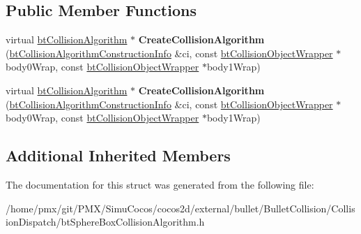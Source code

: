 \subsection*{Public Member Functions}
\begin{DoxyCompactItemize}
\item 
\mbox{\label{structbtSphereBoxCollisionAlgorithm_1_1CreateFunc_a9b840f1c69eb28d91b0cf8dbc6453d09}} 
virtual \hyperlink{classbtCollisionAlgorithm}{bt\+Collision\+Algorithm} $\ast$ {\bfseries Create\+Collision\+Algorithm} (\hyperlink{structbtCollisionAlgorithmConstructionInfo}{bt\+Collision\+Algorithm\+Construction\+Info} \&ci, const \hyperlink{structbtCollisionObjectWrapper}{bt\+Collision\+Object\+Wrapper} $\ast$body0\+Wrap, const \hyperlink{structbtCollisionObjectWrapper}{bt\+Collision\+Object\+Wrapper} $\ast$body1\+Wrap)
\item 
\mbox{\label{structbtSphereBoxCollisionAlgorithm_1_1CreateFunc_a9b840f1c69eb28d91b0cf8dbc6453d09}} 
virtual \hyperlink{classbtCollisionAlgorithm}{bt\+Collision\+Algorithm} $\ast$ {\bfseries Create\+Collision\+Algorithm} (\hyperlink{structbtCollisionAlgorithmConstructionInfo}{bt\+Collision\+Algorithm\+Construction\+Info} \&ci, const \hyperlink{structbtCollisionObjectWrapper}{bt\+Collision\+Object\+Wrapper} $\ast$body0\+Wrap, const \hyperlink{structbtCollisionObjectWrapper}{bt\+Collision\+Object\+Wrapper} $\ast$body1\+Wrap)
\end{DoxyCompactItemize}
\subsection*{Additional Inherited Members}


The documentation for this struct was generated from the following file\+:\begin{DoxyCompactItemize}
\item 
/home/pmx/git/\+P\+M\+X/\+Simu\+Cocos/cocos2d/external/bullet/\+Bullet\+Collision/\+Collision\+Dispatch/bt\+Sphere\+Box\+Collision\+Algorithm.\+h\end{DoxyCompactItemize}
